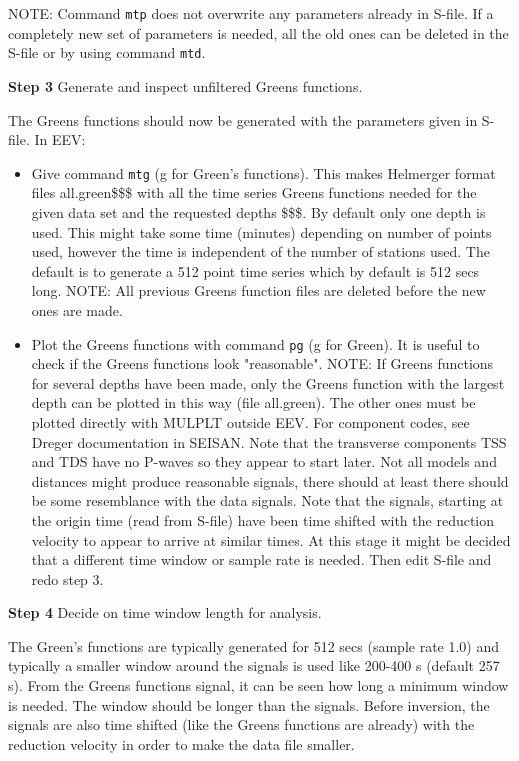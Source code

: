 NOTE: Command \texttt{mtp} does not overwrite any parameters already in S-file. If a completely new set of parameters is needed, all the old ones can be deleted in the S-file or by using command \texttt{mtd}.

\textbf{Step 3} Generate and inspect unfiltered Greens functions.

The Greens functions should now be generated with the parameters given in S-file. In EEV:

\begin{itemize}
\item 
Give command \texttt{mtg} (g for Green's functions). This makes Helmerger format files all.green\$\$\$ with all the time series Greens functions needed for the given data set and the requested depths \$\$\$. By default only one depth is used. This might take some time (minutes) depending on number of points used, however the time is independent of the number of stations used. The default is to generate a 512 point time series which by default is 512 secs long. NOTE: All previous Greens function files are deleted before the new ones are made.
\item Plot the Greens functions with command \texttt{pg} (g for Green). It is useful to check if the Greens functions look "reasonable". NOTE: If Greens functions for several depths have been made, only the Greens function with the largest depth can be plotted in this way (file all.green). The other ones must be plotted directly with MULPLT outside EEV. For component codes, see Dreger documentation in SEISAN. Note that the transverse components TSS and TDS have no P-waves so they appear to start later. Not all models and distances might produce reasonable signals, there should at least there should be some resemblance with the data signals. Note that the signals, starting at the origin time (read from S-file) have been time shifted with the reduction velocity to appear to arrive at similar times. At this stage it might be decided that a different time window or sample rate is needed. Then edit S-file and redo step 3.
\end{itemize}


\textbf{Step 4}  Decide on time window length for analysis.

The Green's functions are typically generated for 512 secs (sample rate 1.0) and typically a smaller window around the signals is used like 200-400 s (default 257 s). From the Greens functions signal, it can be seen how long a minimum window is needed. The window should be longer than the signals. Before inversion, the signals are also time shifted (like the Greens functions are already) with the reduction velocity in order to make the data file smaller.

